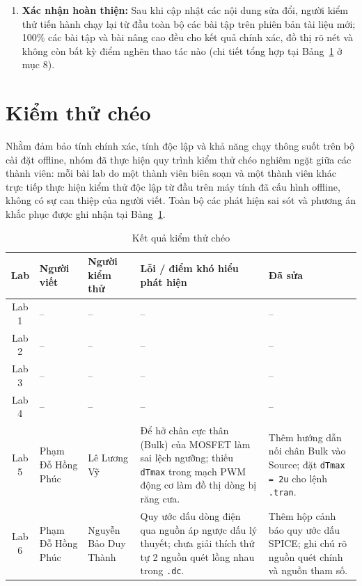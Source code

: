 \documentclass[12pt,a4paper]{article}
\newcommand{\TVa}{Phạm Đỗ Hồng Phúc}   \newcommand{\MSa}{2510359}   \newcommand{\PTa}{-- Lab 5, Lab 6}  %
\newcommand{\TVb}{Lê Lương Vỹ}          \newcommand{\MSb}{2214056}   \newcommand{\PTb}{-- Lab 1, Lab 2}  %
\newcommand{\TVc}{Nguyễn Bảo Duy Thành} \newcommand{\MSc}{2510372}   \newcommand{\PTc}{-- Lab 3, Lab 4}  %
\newcommand{\hc}[1]{\cellcolor{navy}\color{white}\sffamily\bfseries\small #1}
\begin{document}
\begin{enumerate}
  \item \textbf{Xác nhận hoàn thiện:} Sau khi cập nhật các nội dung sửa đổi, người kiểm thử tiến hành chạy lại từ đầu toàn bộ các bài tập trên phiên bản tài liệu mới; 100\% các bài tập và bài nâng cao đều cho kết quả chính xác, đồ thị rõ nét và không còn bất kỳ điểm nghẽn thao tác nào (chi tiết tổng hợp tại Bảng~\ref{tab:kiemthu} ở mục 8).
\end{enumerate}


\section{Kiểm thử chéo}
Nhằm đảm bảo tính chính xác, tính độc lập và khả năng chạy thông suốt trên bộ cài đặt offline, nhóm đã thực hiện quy trình kiểm thử chéo nghiêm ngặt giữa các thành viên: mỗi bài lab do một thành viên biên soạn và một thành viên khác trực tiếp thực hiện kiểm thử độc lập từ đầu trên máy tính đã cấu hình offline, không có sự can thiệp của người viết. Toàn bộ các phát hiện sai sót và phương án khắc phục được ghi nhận tại Bảng~\ref{tab:kiemthu}.
\begin{table}[H]\centering\small
\caption{Kết quả kiểm thử chéo}\label{tab:kiemthu}
\renewcommand{\arraystretch}{1.3}
\begin{tabular}{|c|p{2.5cm}|p{2.5cm}|p{5.4cm}|p{2.2cm}|}
\hline
\hc{Lab} & \hc{Người viết} & \hc{Người kiểm thử} & \hc{Lỗi / điểm khó hiểu phát hiện} & \hc{Đã sửa}\\ \hline
Lab 1 & -- & -- & -- & --\\ \hline
Lab 2 & -- & -- & -- & --\\ \hline
Lab 3 & -- & -- & -- & --\\ \hline
Lab 4 & -- & -- & -- & --\\ \hline
Lab 5 & \TVa & \TVb & Để hở chân cực thân (Bulk) của MOSFET làm sai lệch ngưỡng; thiếu \texttt{dTmax} trong mạch PWM động cơ làm đồ thị dòng bị răng cưa. & Thêm hướng dẫn nối chân Bulk vào Source; đặt \texttt{dTmax = 2u} cho lệnh \texttt{.tran}.\\ \hline
Lab 6 & \TVa & \TVc & Quy ước dấu dòng điện qua nguồn áp ngược dấu lý thuyết; chưa giải thích thứ tự 2 nguồn quét lồng nhau trong \texttt{.dc}. & Thêm hộp cảnh báo quy ước dấu SPICE; ghi chú rõ nguồn quét chính và nguồn tham số.\\ \hline
\end{tabular}
\end{table}
\end{document}
